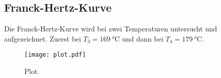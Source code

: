 
\subsection{Franck-Hertz-Kurve} %
\label{sub:Franck-Hertz-Kurve}
Die Franck-Hertz-Kurve wird bei zwei Temperaturen untersucht und aufgezeichnet. Zuerst bei $T_3= \qty{169}{\celsius}$ und dann bei $T_4= \qty{179}{\celsius}$.




\begin{figure}
  \centering
  \texttt{[image: plot.pdf]}
  \caption{Plot.}
  \label{fig:plot}
\end{figure}



